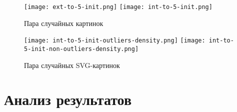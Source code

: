 \begin{figure}[H]
    \texttt{[image: ext-to-5-init.png]}
    \texttt{[image: int-to-5-init.png]} \label{length_entropy}
    \caption{Пара случайных картинок}
\end{figure}

\begin{figure}[H]
    \texttt{[image: int-to-5-init-outliers-density.png]}
    \texttt{[image: int-to-5-init-non-outliers-density.png]} \label{length_entropy}
    \caption{Пара случайных SVG-картинок}
\end{figure}

\clearpage

\section{Анализ результатов}

\clearpage
